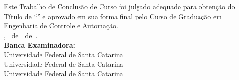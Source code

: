 \imprimircapa


\imprimirfolhaderosto*

\begin{fichacatalografica}
	
\end{fichacatalografica}

\begin{folhadeaprovacao}
	\OnehalfSpacing
	\centering
	\imprimirautor\\%
	\vspace{24pt}		
	\textbf{\imprimirtitulo}%
	\ifnotempty{\imprimirsubtitulo}{:~\imprimirsubtitulo}\\%
	\vspace*{\baselineskip}
	Este Trabalho de Conclusão de Curso foi julgado adequado para obtenção do Título de ``\imprimirformacao'' e aprovado em sua forma final pelo Curso de Graduação em Engenharia de Controle e Automação.\\
	\vspace{12pt}
	\imprimirlocal, \imprimirdia~de~\imprimirmes~de~\imprimirano.\\
	
	\vspace*{18pt}
	\textbf{Banca Examinadora:}\\
	
	\vspace*{24pt}
	\assinatura{\OnehalfSpacing \imprimirbancaa}
	\vspace{6pt}
	Universidade Federal de Santa Catarina\\
	
	\vspace*{24pt}
	\assinatura{\OnehalfSpacing \imprimirbancab}
	\vspace{6pt}
	Universidade Federal de Santa Catarina\\
	
	\vspace*{24pt}
	\assinatura{\OnehalfSpacing \imprimirbancac}
	\vspace{6pt}
	Universidade Federal de Santa Catarina\\
	
\end{folhadeaprovacao}

